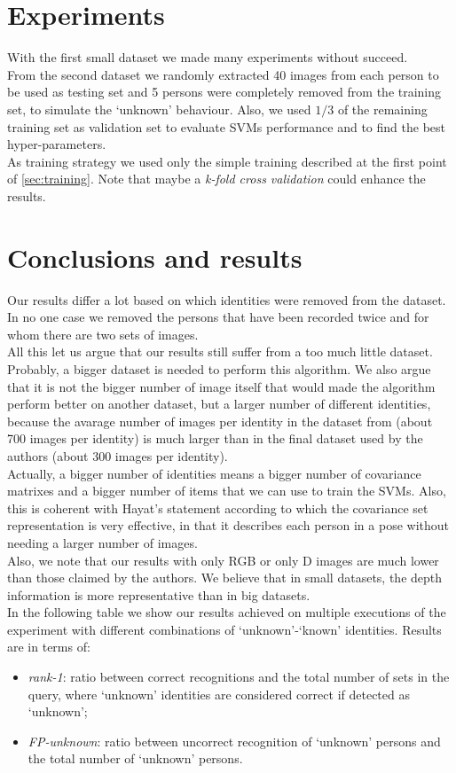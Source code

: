 \documentclass{article}
\begin{document}
\section{Experiments}
With the first small dataset we made many experiments without succeed. \\
From the second dataset we randomly extracted 40 images from each person to be used as testing set and 5 persons were completely removed from the training set, to simulate the `unknown' behaviour. Also, we used $1/3$ of the remaining training set as validation set to evaluate SVMs performance and to find the best hyper-parameters. \\
As training strategy we used only the simple training described at the first point of \ref{sec:training}. Note that maybe a \textit{k-fold cross validation} could enhance the results.

\section{Conclusions and results}
Our results differ a lot based on which identities were removed from the dataset. In no one case we removed the persons that have been recorded twice and for whom there are two sets of images. \\
All this let us argue that our results still suffer from a too much little dataset. Probably, a bigger dataset is needed to perform this algorithm. We also argue that it is not the bigger number of image itself that would made the algorithm perform better on another dataset, but a larger number of different identities, because the avarage number of images per identity in the dataset from \citep{Fanelli2013} (about 700 images per identity) is much larger than in the final dataset used by the authors (about 300 images per identity). \\
Actually, a bigger number of identities means a bigger number of covariance matrixes and a bigger number of items that we can use to train the SVMs. Also, this is coherent with Hayat's statement according to which the covariance set representation is very effective, in that it describes each person in a pose without needing a larger number of images. \\
Also, we note that our results with only RGB or only D images are much lower than those claimed by the authors. We believe that in small datasets, the depth information is more representative than in big datasets. \\
In the following table we show our results achieved on multiple executions of the experiment with different combinations of `unknown'-`known' identities. Results are in terms of:
\begin{itemize}
	\item \textit{rank-1}: ratio between correct recognitions and the total number of sets in the query, where `unknown' identities are considered correct if detected as `unknown';
	\item \textit{FP-unknown}: ratio between uncorrect recognition of `unknown' persons and the total number of `unknown' persons.
\end{itemize}
\end{document}

